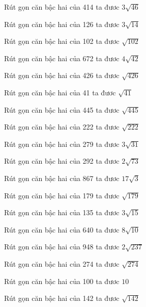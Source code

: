 \documentclass[12pt,a4paper]{article}
\begin{document}
\begin{ex}
Rút gọn căn bậc hai của 414 ta đươc $3\sqrt{46}$
\end{ex}
\begin{ex}
Rút gọn căn bậc hai của 126 ta đươc $3\sqrt{14}$
\end{ex}
\begin{ex}
Rút gọn căn bậc hai của 102 ta đươc $\sqrt{102}$
\end{ex}
\begin{ex}
Rút gọn căn bậc hai của 672 ta đươc $4\sqrt{42}$
\end{ex}
\begin{ex}
Rút gọn căn bậc hai của 426 ta đươc $\sqrt{426}$
\end{ex}
\begin{ex}
Rút gọn căn bậc hai của 41 ta đươc $\sqrt{41}$
\end{ex}
\begin{ex}
Rút gọn căn bậc hai của 445 ta đươc $\sqrt{445}$
\end{ex}
\begin{ex}
Rút gọn căn bậc hai của 222 ta đươc $\sqrt{222}$
\end{ex}
\begin{ex}
Rút gọn căn bậc hai của 279 ta đươc $3\sqrt{31}$
\end{ex}
\begin{ex}
Rút gọn căn bậc hai của 292 ta đươc $2\sqrt{73}$
\end{ex}
\begin{ex}
Rút gọn căn bậc hai của 867 ta đươc $17\sqrt{3}$
\end{ex}
\begin{ex}
Rút gọn căn bậc hai của 179 ta đươc $\sqrt{179}$
\end{ex}
\begin{ex}
Rút gọn căn bậc hai của 135 ta đươc $3\sqrt{15}$
\end{ex}
\begin{ex}
Rút gọn căn bậc hai của 640 ta đươc $8\sqrt{10}$
\end{ex}
\begin{ex}
Rút gọn căn bậc hai của 948 ta đươc $2\sqrt{237}$
\end{ex}
\begin{ex}
Rút gọn căn bậc hai của 274 ta đươc $\sqrt{274}$
\end{ex}
\begin{ex}
Rút gọn căn bậc hai của 100 ta đươc $10$
\end{ex}
\begin{ex}
Rút gọn căn bậc hai của 142 ta đươc $\sqrt{142}$
\end{ex}
\end{document}
